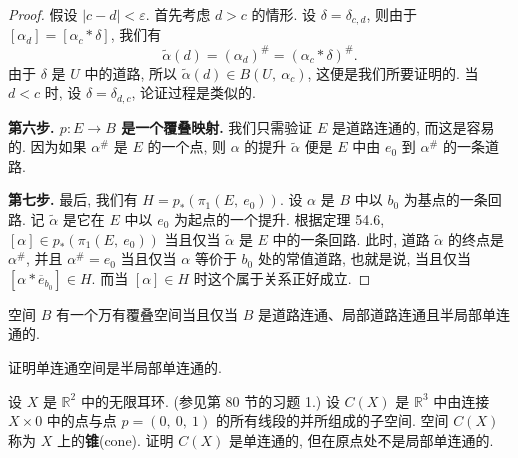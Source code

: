 \begin{proof}
假设 $|c-d|<\varepsilon$. 首先考虑 $d>c$ 的情形. 设 $\delta=\delta_{c,d}$, 则由于 $[\alpha_{d}]=[\alpha_{c}*\delta]$, 我们有
\[
\widetilde{\alpha}(d)=(\alpha_{d})^{\#}=(\alpha_{c}*\delta)^{\#}.
\]
由于 $\delta$ 是 $U$ 中的道路, 所以 $\widetilde{\alpha}(d)\in B(U,\ \alpha_{c})$, 这便是我们所要证明的. 当 $d<c$ 时, 设 $\delta=\delta_{d,c}$, 论证过程是类似的.

\textbf{第六步. $p\colon E\to B$ 是一个覆叠映射.} 我们只需验证 $E$ 是道路连通的, 而这是容易的. 因为如果 $\alpha^{\#}$ 是 $E$ 的一个点, 则 $\alpha$ 的提升 $\widetilde{\alpha}$ 便是 $E$ 中由 $e_{0}$ 到 $\alpha^{\#}$ 的一条道路.

\textbf{第七步.} 最后, 我们有 $H=p_{*}(\pi_{1}(E,\ e_{0}))$. 设 $\alpha$ 是 $B$ 中以 $b_{0}$ 为基点的一条回路. 记 $\widetilde{\alpha}$ 是它在 $E$ 中以 $e_{0}$ 为起点的一个提升. 根据定理 54.6, $[\alpha]\in p_{*}(\pi_{1}(E,\ e_{0}))$ 当且仅当 $\widetilde{\alpha}$ 是 $E$ 中的一条回路. 此时, 道路 $\widetilde{\alpha}$ 的终点是 $\alpha^{\#}$, 并且 $\alpha^{\#}=e_{0}$ 当且仅当 $\alpha$ 等价于 $b_{0}$ 处的常值道路, 也就是说, 当且仅当 $[\alpha*\overline{e}_{b_{0}}]\in H$. 而当 $[\alpha]\in H$ 时这个属于关系正好成立.
\end{proof}

\begin{corollary}[万有覆叠空间的存在条件]
\label{corollary:ch13-universal-existence}
空间 $B$ 有一个万有覆叠空间当且仅当 $B$ 是道路连通、局部道路连通且半局部单连通的.
\end{corollary}

\begin{exercise}
\label{exercise:ch13-sec82-01}
证明单连通空间是半局部单连通的.
\end{exercise}

\begin{exercise}
\label{exercise:ch13-sec82-02}
设 $X$ 是 $\mathbb{R}^{2}$ 中的无限耳环. (参见第 80 节的习题 1.) 设 $C(X)$ 是 $\mathbb{R}^{3}$ 中由连接 $X\times 0$ 中的点与点 $p=(0,\ 0,\ 1)$ 的所有线段的并所组成的子空间. 空间 $C(X)$ 称为 $X$ 上的\textbf{锥}(cone). 证明 $C(X)$ 是单连通的, 但在原点处不是局部单连通的.
\end{exercise}
